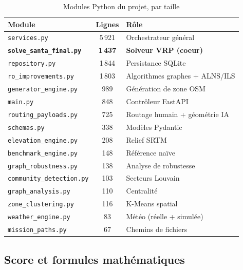 \documentclass[a4paper, 12pt, twoside]{article}
\begin{document}
\begin{table}[h]
  \begin{center}
    \footnotesize
    \begin{tabular}{|l|c|l|}
      \hline
      \textbf{Module} & \textbf{Lignes} & \textbf{R\^{o}le} \\
      \hline
      \texttt{services.py} & 5\,921 & Orchestrateur g\'{e}n\'{e}ral \\
      \textbf{\texttt{solve\_santa\_final.py}} & \textbf{1\,437} & \textbf{Solveur VRP (coeur)} \\
      \texttt{repository.py} & 1\,844 & Persistance SQLite \\
      \texttt{ro\_improvements.py} & 1\,803 & Algorithmes graphes + ALNS/ILS \\
      \texttt{generator\_engine.py} & 989 & G\'{e}n\'{e}ration de zone OSM \\
      \texttt{main.py} & 848 & Contr\^{o}leur FastAPI \\
      \texttt{routing\_payloads.py} & 725 & Routage humain + g\'{e}om\'{e}trie IA \\
      \texttt{schemas.py} & 338 & Mod\`{e}les Pydantic \\
      \texttt{elevation\_engine.py} & 208 & Relief SRTM \\
      \texttt{benchmark\_engine.py} & 148 & R\'{e}f\'{e}rence na\"ive \\
      \texttt{graph\_robustness.py} & 138 & Analyse de robustesse \\
      \texttt{community\_detection.py} & 103 & Secteurs Louvain \\
      \texttt{graph\_analysis.py} & 110 & Centralit\'{e} \\
      \texttt{zone\_clustering.py} & 116 & K-Means spatial \\
      \texttt{weather\_engine.py} & 83 & M\'{e}t\'{e}o (r\'{e}elle + simul\'{e}e) \\
      \texttt{mission\_paths.py} & 67 & Chemins de fichiers \\
      \hline
    \end{tabular}
  \end{center}
  \caption{Modules Python du projet, par taille}
  \label{tab:modules}
\end{table}

\subsection{Score et formules math\'{e}matiques}
\end{document}
